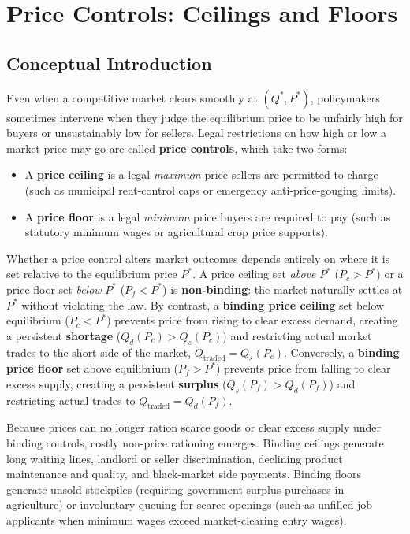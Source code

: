 \documentclass[11pt,letterpaper]{article}
\begin{document}
\section{Price Controls: Ceilings and Floors}

\subsection*{Conceptual Introduction}
Even when a competitive market clears smoothly at $(Q^*, P^*)$, policymakers sometimes intervene when they judge the equilibrium price to be unfairly high for buyers or unsustainably low for sellers. Legal restrictions on how high or low a market price may go are called \textbf{price controls}, which take two forms:
\begin{itemize}
  \item A \textbf{price ceiling} is a legal \emph{maximum} price sellers are permitted to charge (such as municipal rent-control caps or emergency anti-price-gouging limits).
  \item A \textbf{price floor} is a legal \emph{minimum} price buyers are required to pay (such as statutory minimum wages or agricultural crop price supports).
\end{itemize}

Whether a price control alters market outcomes depends entirely on where it is set relative to the equilibrium price $P^*$. A price ceiling set \emph{above} $P^*$ ($P_c > P^*$) or a price floor set \emph{below} $P^*$ ($P_f < P^*$) is \textbf{non-binding}: the market naturally settles at $P^*$ without violating the law. By contrast, a \textbf{binding price ceiling} set below equilibrium ($P_c < P^*$) prevents price from rising to clear excess demand, creating a persistent \textbf{shortage} ($Q_d(P_c) > Q_s(P_c)$) and restricting actual market trades to the short side of the market, $Q_{\text{traded}} = Q_s(P_c)$. Conversely, a \textbf{binding price floor} set above equilibrium ($P_f > P^*$) prevents price from falling to clear excess supply, creating a persistent \textbf{surplus} ($Q_s(P_f) > Q_d(P_f)$) and restricting actual trades to $Q_{\text{traded}} = Q_d(P_f)$.

Because prices can no longer ration scarce goods or clear excess supply under binding controls, costly non-price rationing emerges. Binding ceilings generate long waiting lines, landlord or seller discrimination, declining product maintenance and quality, and black-market side payments. Binding floors generate unsold stockpiles (requiring government surplus purchases in agriculture) or involuntary queuing for scarce openings (such as unfilled job applicants when minimum wages exceed market-clearing entry wages).
\end{document}
